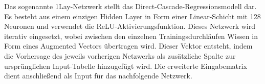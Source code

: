 Das sogenannte 1Lay-Netzwerk stellt das Direct-Cascade-Regressionsmodell dar. Es besteht aus einem einzigen Hidden Layer in Form einer 
Linear-Schicht mit 128 Neuronen und verwendet die ReLU-Aktivierungsfunktion. Dieses Netzwerk wird iterativ eingesetzt, wobei zwischen den 
einzelnen Trainingsdurchläufen Wissen in Form eines Augmented Vectors übertragen wird. Dieser Vektor entsteht, indem die Vorhersage des 
jeweils vorherigen Netzwerks als zusätzliche Spalte zur ursprünglichen Input-Tabelle hinzugefügt wird. Die erweiterte Eingabematrix dient 
anschließend als Input für das nachfolgende Netzwerk.
